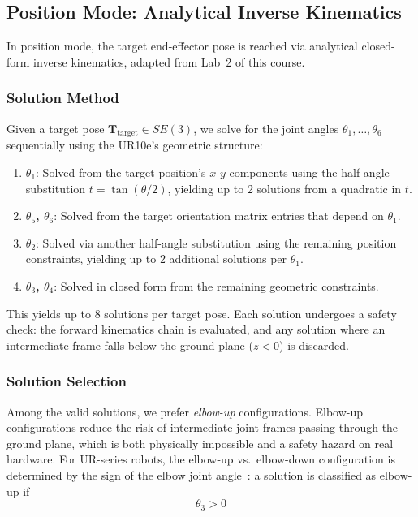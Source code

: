 \subsection{Position Mode: Analytical Inverse Kinematics}

In position mode, the target end-effector pose is reached via analytical closed-form inverse kinematics, adapted from Lab~2 of this course.

\subsubsection{Solution Method}

Given a target pose $\mathbf{T}_\text{target} \in SE(3)$, we solve for the joint angles $\theta_1, \ldots, \theta_6$ sequentially using the UR10e's geometric structure:

\begin{enumerate}
    \item \textbf{$\theta_1$}: Solved from the target position's $x$-$y$ components using the half-angle substitution $t = \tan(\theta/2)$, yielding up to 2 solutions from a quadratic in $t$.
    \item \textbf{$\theta_5$, $\theta_6$}: Solved from the target orientation matrix entries that depend on $\theta_1$.
    \item \textbf{$\theta_2$}: Solved via another half-angle substitution using the remaining position constraints, yielding up to 2 additional solutions per $\theta_1$.
    \item \textbf{$\theta_3$, $\theta_4$}: Solved in closed form from the remaining geometric constraints.
\end{enumerate}

This yields up to 8 solutions per target pose. Each solution undergoes a safety check: the forward kinematics chain is evaluated, and any solution where an intermediate frame falls below the ground plane ($z < 0$) is discarded.

\subsubsection{Solution Selection}

Among the valid solutions, we prefer \emph{elbow-up} configurations. Elbow-up configurations reduce the risk of intermediate joint frames passing through the ground plane, which is both physically impossible and a safety hazard on real hardware. For UR-series robots, the elbow-up vs.\ elbow-down configuration is determined by the sign of the elbow joint angle~\cite{williams_ur_kinematics}: a solution is classified as elbow-up if
\begin{equation}
    \theta_3 > 0
\end{equation}

